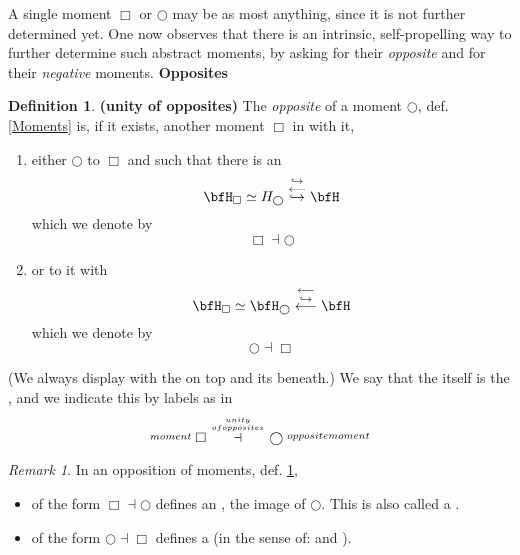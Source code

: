 \documentclass[12pt,titlepage]{article}
\theoremstyle{plain}
\theoremstyle{definition}
\newtheorem{defn}{Definition}
\theoremstyle{remark}
\newtheorem{remark}{Remark}
\begin{document}
A single moment $\Box$ or $\bigcirc$ may be  as most anything, since it is not further determined yet. One now observes that there is an intrinsic, self-propelling way to further determine such abstract moments, by asking for their \emph{opposite} and for their \emph{negative} moments.
\textbf{Opposites}
\begin{defn}
\label{UnityOfOpposites}\hypertarget{UnityOfOpposites}{}
\textbf{(unity of opposites)}
The \emph{opposite} of a moment $\bigcirc$, def. \ref{Moments} is, if it exists, another moment $\Box$ in  with it,
\begin{enumerate}%
\item either $\bigcirc$  to $\Box$ and such that there is an 
\begin{displaymath}
\bfH_{\Box}\simeq H_{\bigcirc}
\stackrel{\hookrightarrow}{\stackrel{\longleftarrow}{\hookrightarrow}}
\bfH
\end{displaymath}
which we denote by
\begin{displaymath}
\Box \dashv \bigcirc
\end{displaymath}
\item or  to it with
\begin{displaymath}
\bfH_{\Box}\simeq \bfH_{\bigcirc}
\stackrel{\longleftarrow}{\stackrel{\hookrightarrow}{\longleftarrow}}
\bfH
\end{displaymath}
which we denote by
\begin{displaymath}
\bigcirc \dashv \Box
\end{displaymath}
\end{enumerate}
(We always display  with the  on top and its  beneath.)
We say that the  itself is the , and we indicate this by labels as in
\begin{displaymath}
\stackrel{moment}{} \Box \stackrel{unity \atop {ofopposites}}{\dashv} \bigcirc \stackrel{oppositemoment}{}
\end{displaymath}
\end{defn}
\begin{remark}
\label{}\hypertarget{}{}
In  an opposition of moments, def. \ref{UnityOfOpposites},
\begin{itemize}%
\item of the form $\Box \dashv \bigcirc$ defines an  , the image of $\bigcirc$. This is also called a .
\item of the form $\bigcirc \dashv \Box$ defines a  (in the sense of:  and ).
\end{itemize}
\end{remark}
\end{document}
